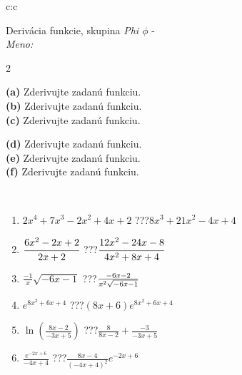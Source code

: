 \documentclass[10pt]{report}
\begin{document}
\newpage
\thispagestyle{empty}
\begin{tabular}{c:c}
\begin{minipage}[c][104.5mm][t]{0.5\linewidth}
\begin{center}
\vspace{7mm}
{\huge Derivácia funkcie, skupina \textit{Phi $\phi$} -}\\[5mm]
\textit{Meno:}\phantom{xxxxxxxxxxxxxxxxxxxxxxxxxxxxxxxxxxxxxxxxxxxxxxxxxxxxxxxxxxxxxxxxx}\\[5mm]
\begin{minipage}{0.95\linewidth}
\begin{center}
{\small \begin{multicols}{2} \raggedright
\textbf{(a)} Zderivujte zadanú funkciu. \\[1mm]
\textbf{(b)} Zderivujte zadanú funkciu. \\[1mm]
\textbf{(c)} Zderivujte zadanú funkciu. \par \columnbreak
\textbf{(d)} Zderivujte zadanú funkciu. \\[1mm]
\textbf{(e)} Zderivujte zadanú funkciu. \\[1mm]
\textbf{(f)} Zderivujte zadanú funkciu.
\end{multicols}
}
\end{center}
\end{minipage}
\\[4mm]
\begin{minipage}{0.79\linewidth}
\begin{center}
\begin{varwidth}{\linewidth}
\begin{enumerate}
\normalsize
\item $2x^4+7x^3-2x^2+4x+2$\quad \dotfill\; ???\;\dotfill \quad $8x^3+21x^2-4x+4$
\item $\cfrac{6x^2-2x+2}{2x+2}$\quad \dotfill\; ???\;\dotfill \quad $\cfrac{12x^2-24x-8}{4x^2+8x+4}$
\item $\frac{-1}{x}\sqrt{-6x-1}$\quad \dotfill\; ???\;\dotfill \quad $\frac{-6x-2}{x^2 \sqrt{\smash[b]{-6x-1}}}$
\item $e^{8x^2+6x+4}$\quad \dotfill\; ???\;\dotfill \quad $(8x+6)e^{8x^2+6x+4}$
\item $\ln{\left(\frac{8x-2}{-3x+5}\right)}$\quad \dotfill\; ???\;\dotfill \quad $\frac{8}{8x-2}+\frac{-3}{-3x+5}$
\item $\frac{e^{-2x+6}}{-4x+4}$\quad \dotfill\; ???\;\dotfill \quad $\frac{8x-4}{(-4x+4)^2}e^{-2x+6}$
\end{enumerate}

\end{varwidth}
\end{center}
\end{minipage}
\end{center}
\end{minipage}
\end{tabular}
\end{document}
